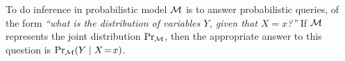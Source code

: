 \documentclass{article}
\begin{document}

{\color{red}
To do inference in probabilistic model $\cal M$ is to answer probabilistic queries, of the form
\textit{``what is the distribution of variables $Y$, given that $X\!=\!x$?''}
%
If $\cal M$ represents the joint distribution $\Pr_{\cal M}$, then the
appropriate answer to this question is $\Pr_{\cal M}(Y \mid X\!=\!x)$.}
\end{document}
